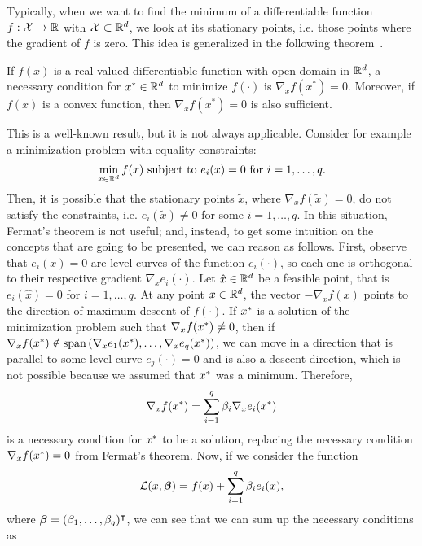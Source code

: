 Typically, when we want to find the minimum of a differentiable function $f: \mathcal{X} \to \mathbb{R}$ with $\mathcal{X} \subset \mathbb{R}^d$, we look at its stationary points, i.e. those points where the gradient of $f$ is zero. This idea is generalized in the following theorem~\citet{CS2000}.
\begin{theorem}
    If $f(x)$ is a real-valued differentiable function with open domain in $\mathbb{R}^d$, a necessary condition for $x^* \in \mathbb{R}^d$ to minimize $f(\cdot)$ is $\nabla_x f(x^*) = 0$. Moreover, if $f(x)$ is a convex function, then $\nabla_x f(x^*) = 0$ is also sufficient.
\end{theorem}
This is a well-known result, but it is not always applicable. Consider for example a minimization problem with equality constraints:
$$ \min_{x \in \mathbb{R}^d} f(x) \text{ subject to } e_i(x)=0 \text{ for } i=1, \ldots, q .$$
Then, it is possible that the stationary points $\tilde{x}$, where $\nabla_x f(\tilde{x}) = 0$, do not satisfy the constraints, i.e. $e_i(\tilde{x}) \neq 0$ for some $i=1, \ldots, q$. In this situation, Fermat's theorem is not useful; and, instead, to get some intuition on the concepts that are going to be presented, we can reason as follows. 
%
First, observe that $e_i(x)=0$ are level curves of the function $e_i(\cdot)$, so each one is orthogonal to their respective gradient $\nabla_x e_i(\cdot)$.  Let $\hat{x} \in \mathbb{R}^d$ be a feasible point, that is $e_i(\hat{x})=0$ for $i=1, \ldots, q$.
At any point $x \in \mathbb{R}^d$, the vector $-\nabla_x f(x)$ points to the direction of maximum descent of $f(\cdot)$.
If ${x}^*$ is a solution of the minimization problem such that $\nabla_x f({x}^*) \neq 0$, then if $\nabla_x f({x}^*) \notin \operatorname{span}\left(\nabla_x e_1({x}^*), \ldots, \nabla_x e_q({x}^*) \right)$, we can move in a direction that is parallel to some level curve $e_j(\cdot)=0$ and is also a descent direction, which is not possible because we assumed that ${x}^*$ was a minimum.
Therefore,
\begin{equation}
    \label{eq:intuition_lagr}
    \nabla_x f(\opt{x}) = \sum_{i=1}^q \beta_i \nabla_x e_i(\opt{x})
\end{equation}
is a necessary condition for ${x}^*$ to be a solution, replacing the necessary condition $\nabla_x f({x}^*) = 0$ from Fermat's theorem.
%
Now, if we consider the function $$\mathcal{L}(x, \bm{\beta}) = f(x) + \sum_{i=1}^q \beta_i e_i(x),$$ where $\bm{\beta} = (\beta_1, \ldots, \beta_q)^\intercal$, we can see that we can sum up the necessary conditions as 
